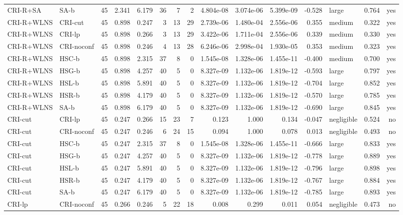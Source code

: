 \begin{table}[htbp]
\begin{tabular}{llrrrrrrrrrrlrr}
CRI-R+SA & SA-b & 45 & 2.341 & 6.179 & 36 & 7 & 2 & 4.804e-08 & 3.074e-06 & 5.399e-09 & -0.528 & large & 0.764 & yes \\
CRI-R+WLNS & CRI-cut & 45 & 0.898 & 0.247 & 3 & 13 & 29 & 2.739e-06 & 1.480e-04 & 2.556e-06 & 0.355 & medium & 0.322 & yes \\
CRI-R+WLNS & CRI-lp & 45 & 0.898 & 0.266 & 3 & 13 & 29 & 3.422e-06 & 1.711e-04 & 2.556e-06 & 0.339 & medium & 0.330 & yes \\
CRI-R+WLNS & CRI-noconf & 45 & 0.898 & 0.246 & 4 & 13 & 28 & 6.246e-06 & 2.998e-04 & 1.930e-05 & 0.353 & medium & 0.323 & yes \\
CRI-R+WLNS & HSC-b & 45 & 0.898 & 2.315 & 37 & 8 & 0 & 1.545e-08 & 1.328e-06 & 1.455e-11 & -0.400 & medium & 0.700 & yes \\
CRI-R+WLNS & HSG-b & 45 & 0.898 & 4.257 & 40 & 5 & 0 & 8.327e-09 & 1.132e-06 & 1.819e-12 & -0.593 & large & 0.797 & yes \\
CRI-R+WLNS & HSL-b & 45 & 0.898 & 5.891 & 40 & 5 & 0 & 8.327e-09 & 1.132e-06 & 1.819e-12 & -0.704 & large & 0.852 & yes \\
CRI-R+WLNS & HSR-b & 45 & 0.898 & 4.179 & 40 & 5 & 0 & 8.327e-09 & 1.132e-06 & 1.819e-12 & -0.570 & large & 0.785 & yes \\
CRI-R+WLNS & SA-b & 45 & 0.898 & 6.179 & 40 & 5 & 0 & 8.327e-09 & 1.132e-06 & 1.819e-12 & -0.690 & large & 0.845 & yes \\
CRI-cut & CRI-lp & 45 & 0.247 & 0.266 & 15 & 23 & 7 & 0.123 & 1.000 & 0.134 & -0.047 & negligible & 0.524 & no \\
CRI-cut & CRI-noconf & 45 & 0.247 & 0.246 & 6 & 24 & 15 & 0.094 & 1.000 & 0.078 & 0.013 & negligible & 0.493 & no \\
CRI-cut & HSC-b & 45 & 0.247 & 2.315 & 37 & 8 & 0 & 1.545e-08 & 1.328e-06 & 1.455e-11 & -0.666 & large & 0.833 & yes \\
CRI-cut & HSG-b & 45 & 0.247 & 4.257 & 40 & 5 & 0 & 8.327e-09 & 1.132e-06 & 1.819e-12 & -0.778 & large & 0.889 & yes \\
CRI-cut & HSL-b & 45 & 0.247 & 5.891 & 40 & 5 & 0 & 8.327e-09 & 1.132e-06 & 1.819e-12 & -0.796 & large & 0.898 & yes \\
CRI-cut & HSR-b & 45 & 0.247 & 4.179 & 40 & 5 & 0 & 8.327e-09 & 1.132e-06 & 1.819e-12 & -0.767 & large & 0.884 & yes \\
CRI-cut & SA-b & 45 & 0.247 & 6.179 & 40 & 5 & 0 & 8.327e-09 & 1.132e-06 & 1.819e-12 & -0.785 & large & 0.893 & yes \\
CRI-lp & CRI-noconf & 45 & 0.266 & 0.246 & 5 & 22 & 18 & 0.008 & 0.299 & 0.011 & 0.054 & negligible & 0.473 & no \\

\end{tabular}
\end{table}
